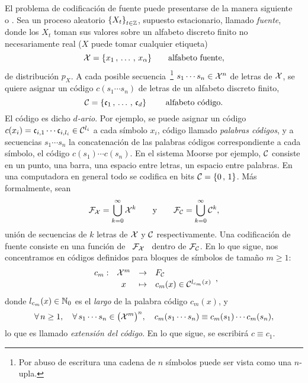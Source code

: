 
\label{Ssec:SZ:Codificacion}

El  problema  de  codificaci\'on  de  fuente  puede  presentarse  de  la  manera
siguiente~\cite[cap.~5]{CovTho06}  o   \cite[cap.~13]{Rio07}.   Sea  un  proceso
aleatorio $\left\{  X_t \right\}_{t \in \mathbb{Z}}$,  supuesto estacionario, llamado
{\it  fuente}, donde  los $X_t$  toman sus  valores sobre  un  alfabeto discreto
finito no necesariamente real ($X$ puede tomar cualquier etiqueta)
%
\[
\mathcal{X} = \{ x_1 \, , \, \ldots \, , \, x_\alpha \} \qquad \mbox{alfabeto fuente},
\]
%
de  distribuci\'on  $p_X$.   A  cada posible  secuencia~\footnote{Por  abuso  de
  escritura una  cadena de  $n$ s\'imbolos puede  ser vista como  una $n$-upla.}
$s_1  \cdots s_n \in  \mathcal{X}^n$ de  letras de  $\mathcal{X}$, se  quiere asignar  un c\'odigo
$c(s_1 \cdots s_n)$ de letras de un alfabeto discreto finito,
%
\[
\mathcal{C} = \{ \mathfrak{c}_1 \, , \, \ldots \, , \, \mathfrak{c}_d \} \qquad \mbox{ alfabeto c\'odigo}.
\]
%
El c\'odigo es dicho {\it $d$-ario}.   Por ejemplo, se puede asignar un c\'odigo
$c(x_i)  = \mathfrak{c}_{i,1}  \cdots  \mathfrak{c}_{i,l_i} \in  \mathcal{C}^{l_i}$  a cada  s\'imbolo $x_i$,
c\'odigo llamado  {\it palabras c\'odigos}, y  a secuencias $s_1  \cdots s_n$ la
concatenaci\'on de las palabras  c\'odigos correspondiente a cada s\'imbolo, \ie
el  c\'odigo $c(s_1) \cdots  c(s_n)$.  En  el sistema  Moorse por  ejemplo, $\mathcal{C}$
consiste en  un punto,  una barra,  una espacio entre  letras, un  espacio entre
palabras.  En una computadora en general todo  se codifica en bits $\mathcal{C} = \{ 0 \,
, \, 1\}$.  M\'as formalmente, sean
%
\[
\mathcal{F}_{\mathcal{X}}   =   \bigcup_{k=0}^{\infty}  \mathcal{X}^k   \qquad   \mbox{y}   \qquad  \mathcal{F}_{\mathcal{C}}   =
\bigcup_{k=0}^{\infty} \mathcal{C}^k,
\]
%
uni\'on  de  secuencias de  $k$  letras de  $\mathcal{X}$  y  $\mathcal{C}$ respectivamente.   Una
codificaci\'on de  fuente consiste  en una  funci\'on de \  $\mathcal{F}_{\mathcal{X}}$ \  dentro de
$\mathcal{F}_{\mathcal{C}}$. En lo  que sigue, nos concentramos en  c\'odigos definidos para bloques
de s\'imbolos de tama\~no $m \ge 1$:
%
\[
\begin{array}{lccl}
c_m: & \X^m & \rightarrow & F_\C\\[.5mm]
%
& x & \mapsto & c_m(x) \in \C^{l_{c_m}(x)}
\end{array},
\]
%
donde $l_{c_m}(x) \in \mathbb{N}_0$ es el  {\it largo} de la palabra c\'odigo $c_m(x)$,
y
%
\[
\forall \,  n \ge 1,  \quad \forall  \, s_1 \cdots  s_n \in \big(  \mathcal{X}^m \big)^n,
\quad c_m(s_1 \cdots s_n) \equiv c_m(s_1) \cdots c_m(s_n),
\]
%
lo  que  es  llamado {\it  extensi\'on  del  c\'odigo}.   En  lo que  sigue,  se
escribir\'a $c \equiv c_1$.

